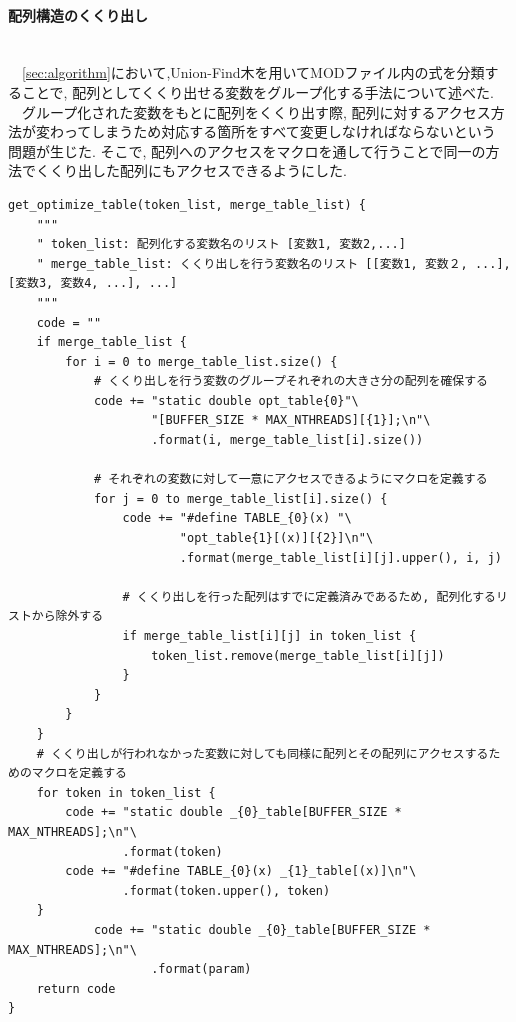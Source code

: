 \paragraph{配列構造のくくり出し}~\\
　\ref{sec:algorithm}において,Union-Find木を用いてMODファイル内の式を分類することで,
配列としてくくり出せる変数をグループ化する手法について述べた.\\
　グループ化された変数をもとに配列をくくり出す際, 配列に対するアクセス方法が変わってしまうため対応する箇所をすべて変更しなければならないという
問題が生じた. そこで, 配列へのアクセスをマクロを通して行うことで同一の方法でくくり出した配列にもアクセスできるようにした.\\
{\footnotesize
\begin{lstlisting}[title=配列構造のくくり出し,label=merge-array, frame=single]
get_optimize_table(token_list, merge_table_list) {
    """
    " token_list: 配列化する変数名のリスト [変数1, 変数2,...]
    " merge_table_list: くくり出しを行う変数名のリスト [[変数1, 変数２, ...], [変数3, 変数4, ...], ...]
    """
    code = ""
    if merge_table_list {
        for i = 0 to merge_table_list.size() {
            # くくり出しを行う変数のグループそれぞれの大きさ分の配列を確保する
            code += "static double opt_table{0}"\
                    "[BUFFER_SIZE * MAX_NTHREADS][{1}];\n"\
                    .format(i, merge_table_list[i].size())

            # それぞれの変数に対して一意にアクセスできるようにマクロを定義する
            for j = 0 to merge_table_list[i].size() {
                code += "#define TABLE_{0}(x) "\
                        "opt_table{1}[(x)][{2}]\n"\
                        .format(merge_table_list[i][j].upper(), i, j)

                # くくり出しを行った配列はすでに定義済みであるため, 配列化するリストから除外する
                if merge_table_list[i][j] in token_list {
                    token_list.remove(merge_table_list[i][j])
                }
            }
        }
    }
    # くくり出しが行われなかった変数に対しても同様に配列とその配列にアクセスするためのマクロを定義する
    for token in token_list {
        code += "static double _{0}_table[BUFFER_SIZE * MAX_NTHREADS];\n"\
                .format(token)
        code += "#define TABLE_{0}(x) _{1}_table[(x)]\n"\
                .format(token.upper(), token)
    }
            code += "static double _{0}_table[BUFFER_SIZE * MAX_NTHREADS];\n"\
                    .format(param)
    return code
}


\end{lstlisting}}
